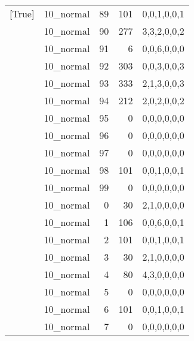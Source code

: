 \begin{tabular}{llrrl}
 [True]          & 10\_normal           &            89 &                   101 & 0,0,1,0,0,1   \\
 [True]          & 10\_normal           &            90 &                   277 & 3,3,2,0,0,2   \\
 [True]          & 10\_normal           &            91 &                     6 & 0,0,6,0,0,0   \\
 [True]          & 10\_normal           &            92 &                   303 & 0,0,3,0,0,3   \\
 [True]          & 10\_normal           &            93 &                   333 & 2,1,3,0,0,3   \\
 [True]          & 10\_normal           &            94 &                   212 & 2,0,2,0,0,2   \\
 [True]          & 10\_normal           &            95 &                     0 & 0,0,0,0,0,0   \\
 [True]          & 10\_normal           &            96 &                     0 & 0,0,0,0,0,0   \\
 [True]          & 10\_normal           &            97 &                     0 & 0,0,0,0,0,0   \\
 [True]          & 10\_normal           &            98 &                   101 & 0,0,1,0,0,1   \\
 [True]          & 10\_normal           &            99 &                     0 & 0,0,0,0,0,0   \\
 [True]          & 10\_normal           &             0 &                    30 & 2,1,0,0,0,0   \\
 [True]          & 10\_normal           &             1 &                   106 & 0,0,6,0,0,1   \\
 [True]          & 10\_normal           &             2 &                   101 & 0,0,1,0,0,1   \\
 [True]          & 10\_normal           &             3 &                    30 & 2,1,0,0,0,0   \\
 [True]          & 10\_normal           &             4 &                    80 & 4,3,0,0,0,0   \\
 [True]          & 10\_normal           &             5 &                     0 & 0,0,0,0,0,0   \\
 [True]          & 10\_normal           &             6 &                   101 & 0,0,1,0,0,1   \\
 [True]          & 10\_normal           &             7 &                     0 & 0,0,0,0,0,0   \\

\end{tabular}
